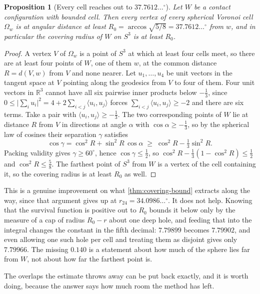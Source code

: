 \documentclass[11pt,reqno]{amsart}
\renewcommand{\_}{\origunderscore\allowbreak}
\numberwithin{equation}{section}
\theoremstyle{plain}
\newtheorem{prop}[thm]{Proposition}
\theoremstyle{definition}
\theoremstyle{remark}
\begin{document}
\begin{prop}[Every cell reaches out to $37.7612\ldots^\circ$]\label{prop:covering-radius}
Let $W$ be a contact configuration with bounded cell. Then every vertex
of every spherical Voronoi cell $\Omega_w$ is at angular distance at
least $R_0=\arccos\sqrt{5/8}=37.7612\ldots^\circ$ from $w$, and in
particular the covering radius of $W$ on $S^3$ is at least $R_0$.
\end{prop}

\begin{proof}
A vertex $V$ of $\Omega_w$ is a point of $S^3$ at which at least four
cells meet, so there are at least four points of $W$, one of them $w$,
at the common distance $R=d(V,w)$ from $V$ and none nearer. Let
$u_1,\dots,u_4$ be unit vectors in the tangent space at $V$ pointing
along the geodesics from $V$ to four of them. Four unit vectors in
$\mathbb{R}^3$ cannot have all six pairwise inner products below
$-\tfrac13$, since
$0\le\bigl|\sum_iu_i\bigr|^2=4+2\sum_{i<j}\langle u_i,u_j\rangle$ forces
$\sum_{i<j}\langle u_i,u_j\rangle\ge-2$ and there are six terms. Take a
pair with $\langle u_i,u_j\rangle\ge-\tfrac13$. The two corresponding
points of $W$ lie at distance $R$ from $V$ in directions at angle
$\alpha$ with $\cos\alpha\ge-\tfrac13$, so by the spherical law of
cosines their separation $\gamma$ satisfies
\[
  \cos\gamma=\cos^2R+\sin^2R\,\cos\alpha
  \;\ge\;\cos^2R-\tfrac13\sin^2R .
\]
Packing validity gives $\gamma\ge60^\circ$, hence
$\cos\gamma\le\tfrac12$, so $\cos^2R-\tfrac13(1-\cos^2R)\le\tfrac12$
and $\cos^2R\le\tfrac58$. The farthest point of $S^3$ from $W$ is a
vertex of the cell containing it, so the covering radius is at least
$R_0$ as well.
\end{proof}

This is a genuine improvement on what \cref{thm:covering-bound} extracts
along the way, since that argument gives up at
$r_{24}=34.0986\ldots^\circ$. It does not help. Knowing that the
survival function is positive out to $R_0$ bounds it below only by the
measure of a cap of radius $R_0-r$ about one deep hole, and feeding that
into the integral changes the constant in the fifth decimal:
$7.79899$ becomes $7.79902$, and even allowing one such hole per cell
and treating them as disjoint gives only $7.79966$. The missing
$0.140$ is a statement about how much of the sphere lies far from $W$,
not about how far the farthest point is.

The overlaps the estimate throws away can be put back exactly, and it is
worth doing, because the answer says how much room the method has left.
\end{document}
